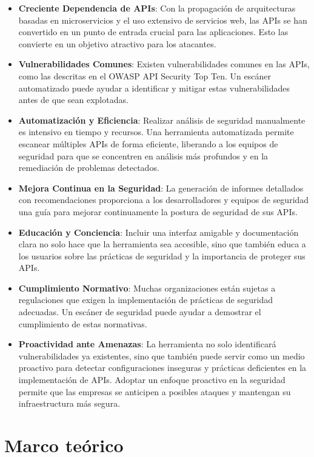 \documentclass{article}
\begin{document}
    \begin{itemize}
        \item \textbf{Creciente Dependencia de APIs}: Con la propagación de arquitecturas basadas en microservicios y el uso extensivo de servicios web, las APIs se han convertido en un punto de entrada crucial para las aplicaciones. Esto las convierte en un objetivo atractivo para los atacantes.
        \item \textbf{Vulnerabilidades Comunes}: Existen vulnerabilidades comunes en las APIs, como las descritas en el OWASP API Security Top Ten. Un escáner automatizado puede ayudar a identificar y mitigar estas vulnerabilidades antes de que sean explotadas.
        \item \textbf{Automatización y Eficiencia}: Realizar análisis de seguridad manualmente es intensivo en tiempo y recursos. Una herramienta automatizada permite escanear múltiples APIs de forma eficiente, liberando a los equipos de seguridad para que se concentren en análisis más profundos y en la remediación de problemas detectados.
        \item \textbf{Mejora Continua en la Seguridad}: La generación de informes detallados con recomendaciones proporciona a los desarrolladores y equipos de seguridad una guía para mejorar continuamente la postura de seguridad de sus APIs.
        \item \textbf{Educación y Conciencia}: Incluir una interfaz amigable y documentación clara no solo hace que la herramienta sea accesible, sino que también educa a los usuarios sobre las prácticas de seguridad y la importancia de proteger sus APIs.
        \item \textbf{Cumplimiento Normativo}: Muchas organizaciones están sujetas a regulaciones que exigen la implementación de prácticas de seguridad adecuadas. Un escáner de seguridad puede ayudar a demostrar el cumplimiento de estas normativas.
        \item \textbf{Proactividad ante Amenazas}: La herramienta no solo identificará vulnerabilidades ya existentes, sino que también puede servir como un medio proactivo para detectar configuraciones inseguras y prácticas deficientes en la implementación de APIs. Adoptar un enfoque proactivo en la seguridad permite que las empresas se anticipen a posibles ataques y mantengan su infraestructura más segura.
    \end{itemize}

    \section{Marco teórico}
\end{document}
